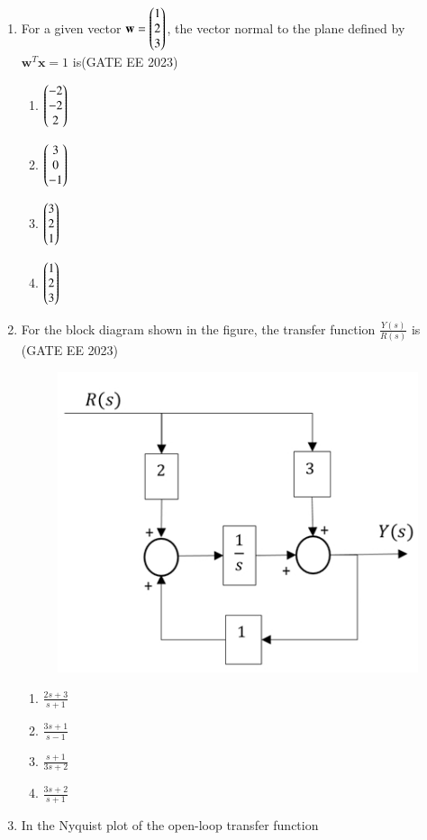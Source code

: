 \documentclass[a4paper,12pt]{exam}
\theoremstyle{remark}
\begin{document}
\begin{enumerate}
\item For a given vector $\textbf{w} = \begin{pmatrix} 1 \\ 2 \\ 3 \end{pmatrix}$, the vector normal to the plane defined by $\textbf{w}^T \textbf{x} = 1$ is\hfill{(GATE EE 2023)}
\begin{multicols}{4}
\begin{enumerate}
    \item $\begin{pmatrix} -2 \\ -2 \\ 2 \end{pmatrix}$
    \item $\begin{pmatrix} 3 \\ 0 \\ -1 \end{pmatrix}$
    \item $\begin{pmatrix} 3 \\ 2 \\ 1 \end{pmatrix}$
    \item $\begin{pmatrix} 1 \\ 2 \\ 3 \end{pmatrix}$
\end{enumerate}
\end{multicols}
\newpage
\item For the block diagram shown in the figure, the transfer function  $\frac{Y(s)}{R(s)}$ is \hfill{(GATE EE 2023)}
\begin{figure}[H]
    \centering
    \includegraphics[width=0.5\columnwidth]{figs/Screenshot_17-8-2025_203411_.jpeg}
    \caption{}
    \label{fig:placeholder}
\end{figure}
\begin{multicols}{4}
\begin{enumerate}
    \item $\frac{2s+3}{s+1}$
    \item $\frac{3s+1}{s-1}$
    \item $\frac{s+1}{3s+2}$
    \item $\frac{3s+2}{s+1}$
\end{enumerate}
\end{multicols}
\item In the Nyquist plot of the open-loop transfer function


\end{enumerate}
\end{document}
